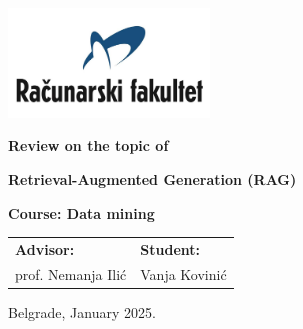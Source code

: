 \documentclass[12pt]{article}
\begin{document}
\begin{titlepage}
    \begin{center}
        
        \vspace*{-1in}
        \includegraphics[width=0.4\textwidth]{raf_logo.png}

        \vspace{1in}
        \Large
        \textbf{Review on the topic of}
        
        \vspace{1in}
        \Huge
        \textbf{Retrieval-Augmented Generation (RAG)}
        
        \vspace{1in}


            \fontsize{18pt}{18pt}\selectfont
            \textbf{Course: Data mining} \\
            \vspace*{1.5in}
            
            \begin{center}
            \normalsize
            \begin{tabular}{p{} p{}}
                \fontsize{14pt}{18pt}\selectfont   
                \textbf{Advisor:} & 
            
                \fontsize{14pt}{18pt}\selectfont
                \textbf{Student:} \\
                prof. Nemanja Ilić & Vanja Kovinić \\
            \end{tabular}
            \end{center}

            \vspace*{\fill}

            \normalsize
            Belgrade, January 2025.


            
        \end{center}
    \end{titlepage}
    \restoregeometry %
\end{document}
